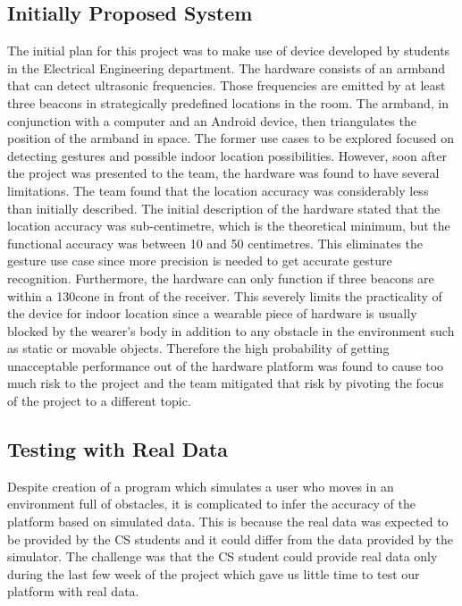 \documentclass[prodmode,acmtosem]{acmsmall} %
\begin{document}
\subsection{Initially Proposed System}
\label{sec:Prelim}
The initial plan for this project was to make use of device developed by students in the Electrical Engineering department. The hardware consists of an armband that can detect ultrasonic frequencies. Those frequencies are emitted by at least three beacons in strategically predefined locations in the room. The armband, in conjunction with a computer and an Android device, then triangulates the position of the armband in space.
The former use cases to be explored focused on detecting gestures and possible indoor location possibilities. However, soon after the project was presented to the team, the hardware was found to have several limitations. The team found that the location accuracy was considerably less than initially described. The initial description of the hardware stated that the location accuracy was sub-centimetre, which is the theoretical minimum, but the functional accuracy was between 10 and 50 centimetres. This eliminates the gesture use case since more precision is needed to get accurate gesture recognition.
Furthermore, the hardware can only function if three beacons are within a 130\degree cone in front of the receiver. This severely limits the practicality of the device for indoor location since a wearable piece of hardware is usually blocked by the wearer's body in addition to any obstacle in the environment such as static or movable objects.
Therefore the high probability of getting unacceptable performance out of the hardware platform was found to cause too much risk to the project and the team mitigated that risk by pivoting the focus of the project to a different topic.

\subsection{Testing with Real Data}
Despite creation of a program which simulates a user who moves in an environment full of obstacles, it is complicated to infer the accuracy of the platform based on simulated data. This is because the real data was expected to be provided by the CS students and it could differ from the data provided by the simulator. The challenge was that the CS student could provide real data only during the last few week of the project which gave us little time to test our platform with real data. 
\end{document}
